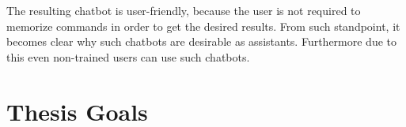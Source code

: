 The resulting chatbot is user-friendly, because the user is not required to memorize commands in order to get the desired results. From such standpoint, it becomes clear why such chatbots are desirable as assistants. Furthermore due to this even non-trained users can use such chatbots.
\newpage

\section{Thesis Goals}

\blankpage
